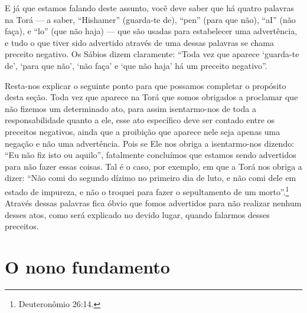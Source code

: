 E já que estamos falando deste assunto, você deve saber que há quatro
palavras na Torá --- a saber, ``Hishamer'' (guarda-te de), ``pen''
(para que não), ``aI'' (não faça), e ``lo'' (que não haja) --- que são
usadas para estabelecer uma advertência, e tudo o que tiver sido
advertido através de uma dessas palavras se chama preceito negativo. Os
Sábios dizem claramente: ``Toda vez que aparece `guarda-te de', `para
que não', `não faça' e `que não haja' há um preceito negativo''.

Resta-nos explicar o seguinte ponto para que possamos completar o
propósito desta seção. Toda vez que aparece na Torá que somos obrigados
a proclamar que não fizemos um determinado ato, para assim isentarmo-nos
de toda a responsabilidade quanto a ele, esse ato específico deve ser
contado entre os preceitos negativos, ainda que a proibição que aparece
nele seja apenas uma negação e não uma advertência. Pois se Ele nos
obriga a isentarmo-nos dizendo: ``Eu não fiz isto ou aquilo'',
fatalmente concluímos que estamos sendo advertidos para não fazer essas
coisas. Tal é o caso, por exemplo, em que a Torá nos obriga a dizer:
``Não comi do segundo dízimo no primeiro dia de luto, e não comi dele em
estado de impureza, e não o troquei para fazer o sepultamento de um
morto''.\footnote{Deuteronômio 26:14.} Através dessas palavras fica óbvio que
fomos advertidos para não realizar nenhum desses atos, como será
explicado no devido lugar, quando falarmos desses preceitos.

\chapter*{O nono fundamento}

